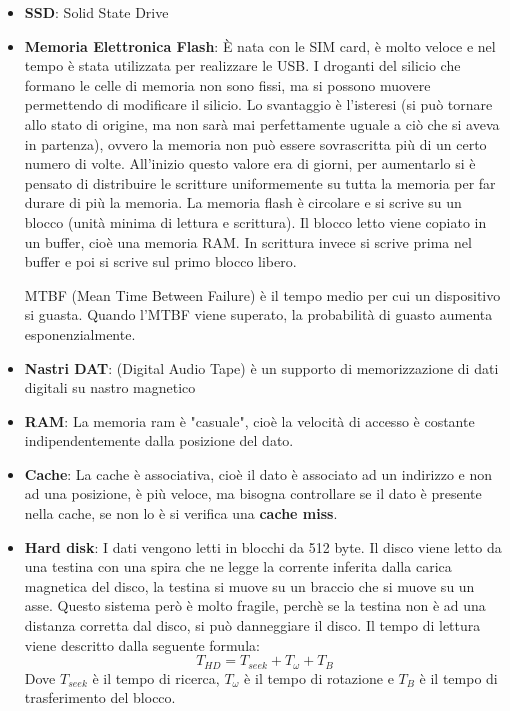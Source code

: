 \documentclass[a4paper]{article}
\theoremstyle{break}
\theoremstyle{break}
\theoremstyle{break}
\theoremstyle{break}
\begin{document}
\begin{itemize}
  \item \textbf{SSD}: Solid State Drive
  \item \textbf{Memoria Elettronica Flash}: È nata con le SIM card, è molto veloce
    e nel tempo è stata utilizzata per realizzare le USB. I droganti del silicio che formano
    le celle di memoria non sono fissi, ma si possono muovere permettendo di modificare
    il silicio. Lo svantaggio è l'isteresi (si può tornare allo stato di origine, ma non sarà
    mai perfettamente uguale a ciò che si aveva in partenza), ovvero la memoria non può essere sovrascritta
    più di un certo numero di volte. All'inizio questo valore era di giorni, per aumentarlo
    si è pensato di distribuire le scritture uniformemente su tutta la memoria per far 
    durare di più la memoria. La memoria flash è circolare e si scrive su un blocco (unità
    minima di lettura e scrittura). Il blocco letto viene copiato in un buffer, cioè una
    memoria RAM. In scrittura invece si scrive prima nel buffer e poi si scrive sul primo
    blocco libero.

    \noindent MTBF (Mean Time Between Failure) è il tempo medio per cui un dispositivo si guasta.
    Quando l'MTBF viene superato, la probabilità di guasto aumenta esponenzialmente.
  \item \textbf{Nastri DAT}: (Digital Audio Tape) è un supporto di memorizzazione
    di dati digitali su nastro magnetico
  \item \textbf{RAM}: La memoria ram è "casuale", cioè la velocità di accesso è costante
    indipendentemente dalla posizione del dato.

  \item \textbf{Cache}: La cache è associativa, cioè il dato è associato ad un indirizzo
    e non ad una posizione, è più veloce, ma bisogna controllare se il dato è presente
    nella cache, se non lo è si verifica una \textbf{cache miss}.
  \item \textbf{Hard disk}: I dati vengono letti in blocchi da 512 byte. Il disco viene 
    letto da una testina con una spira che ne legge la corrente inferita dalla carica
    magnetica del disco, la testina si muove su un braccio che si muove su un asse.
    Questo sistema però è molto fragile, perchè se la testina non è ad una distanza 
    corretta dal disco, si può danneggiare il disco. Il tempo di lettura viene descritto
    dalla seguente formula:
    \[
      T_{HD} = T_{seek} + T_{\omega} + T_{B}
    \] 
    Dove \( T_{seek} \) è il tempo di ricerca, \( T_{\omega} \) è il tempo di rotazione
    e \( T_{B} \) è il tempo di trasferimento del blocco.


\end{itemize}
\end{document}
